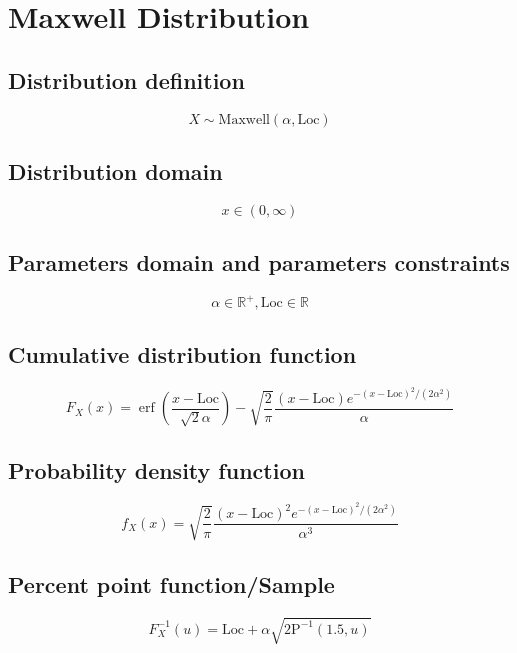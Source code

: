 \documentclass{article}
\begin{document}
\newpage
\section{Maxwell Distribution}
\subsection{Distribution definition}
\begin{equation*} X\sim\mathrm{Maxwell}\left(\alpha,\text{Loc}\right) \end{equation*}
\subsection{Distribution domain}
\begin{equation*} x\in\left(0,\infty\right) \end{equation*}
\subsection{Parameters domain and parameters constraints}
\begin{equation*} \alpha\in\mathbb{R}^{+}, \text{Loc}\in\mathbb{R} \end{equation*}
\subsection{Cumulative distribution function}
\begin{equation*} F_{X}\left(x\right)=\operatorname{erf}\left(\frac{x-\text{Loc}}{\sqrt{2} \alpha}\right) -\sqrt{\frac{2}{\pi}}\frac{(x-\text{Loc}) e^{-(x-\text{Loc})^2/\left(2\alpha^2\right)}}{\alpha} \end{equation*}
\subsection{Probability density function}
\begin{equation*} f_{X}\left(x\right)=\sqrt{\frac{2}{\pi}}\frac{(x-\text{Loc})^2 e^{-(x-\text{Loc})^2/\left(2\alpha^2\right)}}{\alpha^3} \end{equation*}
\subsection{Percent point function/Sample}
\begin{equation*} F^{-1}_{X}\left(u\right)=\text{Loc}+\alpha\sqrt{2\text{P}^{-1}\left(1.5,u\right)} \end{equation*}
\end{document}
